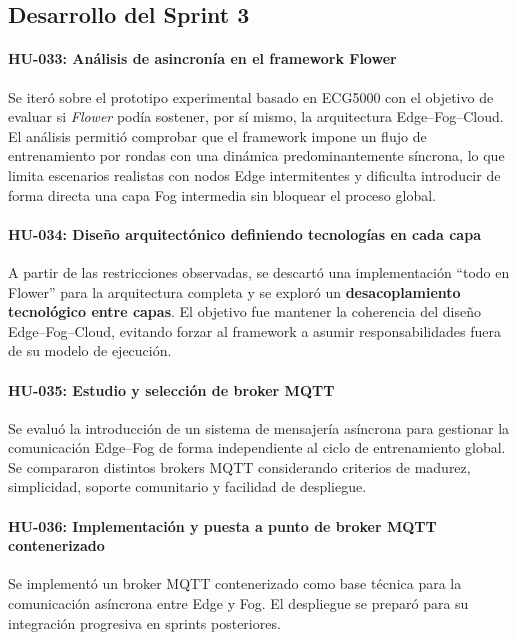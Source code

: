 \documentclass{report}
\begin{document}
\subsection{Desarrollo del Sprint 3}

\paragraph{HU-033: Análisis de asincronía en el framework Flower}
Se iteró sobre el prototipo experimental basado en ECG5000 con el objetivo de evaluar si \textit{Flower} podía sostener, por sí mismo, la arquitectura Edge--Fog--Cloud. El análisis permitió comprobar que el framework impone un flujo de entrenamiento por rondas con una dinámica predominantemente síncrona, lo que limita escenarios realistas con nodos Edge intermitentes y dificulta introducir de forma directa una capa Fog intermedia sin bloquear el proceso global.

\paragraph{HU-034: Diseño arquitectónico definiendo tecnologías en cada capa}
A partir de las restricciones observadas, se descartó una implementación ``todo en Flower'' para la arquitectura completa y se exploró un \textbf{desacoplamiento tecnológico entre capas}. El objetivo fue mantener la coherencia del diseño Edge--Fog--Cloud, evitando forzar al framework a asumir responsabilidades fuera de su modelo de ejecución.

\paragraph{HU-035: Estudio y selección de broker MQTT}
Se evaluó la introducción de un sistema de mensajería asíncrona para gestionar la comunicación Edge--Fog de forma independiente al ciclo de entrenamiento global. Se compararon distintos brokers MQTT considerando criterios de madurez, simplicidad, soporte comunitario y facilidad de despliegue.

\paragraph{HU-036: Implementación y puesta a punto de broker MQTT contenerizado}
Se implementó un broker MQTT contenerizado como base técnica para la comunicación asíncrona entre Edge y Fog. El despliegue se preparó para su integración progresiva en sprints posteriores.
\end{document}

